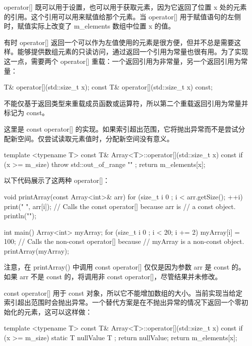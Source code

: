 operator[] 既可以用于设置，也可以用于获取元素，因为它返回了位置 x 处的元素的引用。这个引用可以用来赋值给那个元素。当 operator[] 用于赋值语句的左侧时，赋值实际上改变了 m\_elements 数组中位置 x 的值。


有时 operator[] 返回一个可以作为左值使用的元素是很方便，但并不总是需要这样。能够提供数组元素的只读访问，通过返回一个引用为常量也很有用。为了实现这一点，需要两个 operator[] 重载：一个返回引用为非常量，另一个返回引用为常量：

\begin{cpp}
T& operator[](std::size_t x);
const T& operator[](std::size_t x) const;
\end{cpp}

不能仅基于返回类型来重载成员函数或运算符，所以第二个重载返回引用为常量并标记为 const。

这里是 const operator[] 的实现。如果索引超出范围，它将抛出异常而不是尝试分配新空间。仅尝试读取元素值时，分配新空间没有意义。

\begin{cpp}
template <typename T> const T& Array<T>::operator[](std::size_t x) const
{
    if (x >= m_size) { throw std::out_of_range { "" }; }
    return m_elements[x];
}
\end{cpp}

以下代码展示了这两种 operator[]：

\begin{cpp}
void printArray(const Array<int>& arr)
{
    for (size_t i { 0 }; i < arr.getSize(); ++i) {
        print("{} ", arr[i]); // Calls the const operator[] because arr is
                              // a const object.
    }
    println("");
}

int main()
{
    Array<int> myArray;
    for (size_t i { 0 }; i < 20; i += 2) {
        myArray[i] = 100; // Calls the non-const operator[] because
                          // myArray is a non-const object.
    }
    printArray(myArray);
}
\end{cpp}

注意，在 printArray() 中调用 const operator[] 仅仅是因为参数 arr 是 const 的。如果 arr 不是 const 的，将调用非 const operator[]，尽管结果并未修改。

const operator[] 用于 const 对象，所以它不能增加数组的大小。当前实现当给定索引超出范围时会抛出异常。一个替代方案是在不抛出异常的情况下返回一个零初始化的元素，这可以这样做：

\begin{cpp}
template <typename T> const T& Array<T>::operator[](std::size_t x) const
{
    if (x >= m_size) {
        static T nullValue { T{} };
        return nullValue;
    }
    return m_elements[x];
}
\end{cpp}

